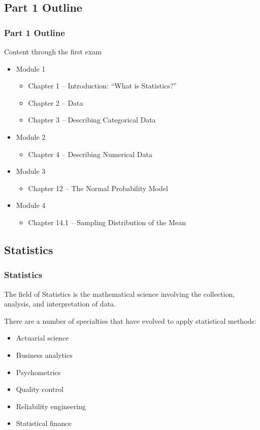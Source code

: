 \documentclass[handout]{beamer}
\begin{document}
\subsection{Part 1 Outline}
\begin{frame}
\frametitle{Part 1 Outline}

Content through the first exam

\begin{itemize}
\item Module 1
  \begin{itemize}
  \item Chapter 1 -- Introduction: ``What is Statistics?''
  \item Chapter 2 -- Data
  \item Chapter 3 -- Describing Categorical Data
  \end{itemize}
\item Module 2
  \begin{itemize}
  \item Chapter 4 -- Describing Numerical Data
  \end{itemize}
\item Module 3
  \begin{itemize}
  \item Chapter 12 --  The Normal Probability Model
  \end{itemize}
\item Module 4
  \begin{itemize}
  \item Chapter 14.1 -- Sampling Distribution of the Mean
  \end{itemize}
\end{itemize}
\end{frame}


\subsection{Statistics}
\begin{frame}
\frametitle{Statistics}
\begin{definition}
The field of \alert{Statistics} is the mathematical science involving the 
collection, analysis, and interpretation of data.
\end{definition}

\vspace{0.1in} \pause

There are a number of specialties that have evolved to apply statistical methods:
\begin{itemize}
\item Actuarial science
\item Business analytics
\item Psychometrics
\item Quality control
\item Reliability engineering
\item Statistical finance
\end{itemize}
\end{frame}
\end{document}
